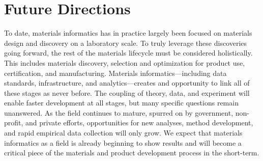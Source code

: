 \section{Future Directions}
To date, materials informatics has in practice largely been focused on materials design and discovery on a laboratory scale. To truly leverage these discoveries going forward, the rest of the materials lifecycle must be considered holistically. This includes materials discovery, selection and optimization for product use, certification, and manufacturing. Materials informatics---including data standards, infrastructure, and analytics---creates and opportunity to link all of these stages as never before. The coupling of theory, data, and experiment will enable faster development at all stages, but many specific questions remain unanswered. As the field continues to mature, spurred on by government, non-profit, and private efforts, opportunities for new analyses, method development, and rapid empirical data collection will only grow. We expect that materials informatics as a field is already beginning to show results and will become a critical piece of the materials and product development process in the short-term.
